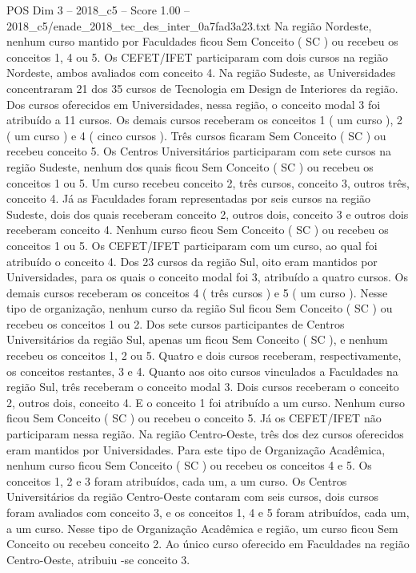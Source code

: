 \begin{textsample}{POS Dim 3 – 2018\_c5 – Score 1.00 – 2018\_c5/enade\_2018\_tec\_des\_inter\_0a7fad3a23.txt}
Na região Nordeste, nenhum curso mantido por Faculdades ficou Sem Conceito ( SC ) ou recebeu os conceitos 1, 4 ou 5.
Os CEFET/IFET participaram com dois cursos na região Nordeste, ambos avaliados com conceito 4.
Na região Sudeste, as Universidades concentraram 21 dos 35 cursos de Tecnologia em Design de Interiores da região.
Dos cursos oferecidos em Universidades, nessa região, o conceito modal 3 foi atribuído a 11 cursos.
Os demais cursos receberam os conceitos 1 ( um curso ), 2 ( um curso ) e 4 ( cinco cursos ).
Três cursos ficaram Sem Conceito ( SC ) ou recebeu conceito 5.
Os Centros Universitários participaram com sete cursos na região Sudeste, nenhum dos quais ficou Sem Conceito ( SC ) ou recebeu os conceitos 1 ou 5.
Um curso recebeu conceito 2, três cursos, conceito 3, outros três, conceito 4.
Já as Faculdades foram representadas por seis cursos na região Sudeste, dois dos quais receberam conceito 2, outros dois, conceito 3 e outros dois receberam conceito 4.
Nenhum curso ficou Sem Conceito ( SC ) ou recebeu os conceitos 1 ou 5.
Os CEFET/IFET participaram com um curso, ao qual foi atribuído o conceito 4.
Dos 23 cursos da região Sul, oito eram mantidos por Universidades, para os quais o conceito modal foi 3, atribuído a quatro cursos.
Os demais cursos receberam os conceitos 4 ( três cursos ) e 5 ( um curso ).
Nesse tipo de organização, nenhum curso da região Sul ficou Sem Conceito ( SC ) ou recebeu os conceitos 1 ou 2.
Dos sete cursos participantes de Centros Universitários da região Sul, apenas um ficou Sem Conceito ( SC ), e nenhum recebeu os conceitos 1, 2 ou 5.
Quatro e dois cursos receberam, respectivamente, os conceitos restantes, 3 e 4.
Quanto aos oito cursos vinculados a Faculdades na região Sul, três receberam o conceito modal 3.
Dois cursos receberam o conceito 2, outros dois, conceito 4.
E o conceito 1 foi atribuído a um curso.
Nenhum curso ficou Sem Conceito ( SC ) ou recebeu o conceito 5.
Já os CEFET/IFET não participaram nessa região.
Na região Centro-Oeste, três dos dez cursos oferecidos eram mantidos por Universidades.
Para este tipo de Organização Acadêmica, nenhum curso ficou Sem Conceito ( SC ) ou recebeu os conceitos 4 e 5.
Os conceitos 1, 2 e 3 foram atribuídos, cada um, a um curso.
Os Centros Universitários da região Centro-Oeste contaram com seis cursos, dois cursos foram avaliados com conceito 3, e os conceitos 1, 4 e 5 foram atribuídos, cada um, a um curso.
Nesse tipo de Organização Acadêmica e região, um curso ficou Sem Conceito ou recebeu conceito 2.
Ao único curso oferecido em Faculdades na região Centro-Oeste, atribuiu -se conceito 3.

\end{textsample}
